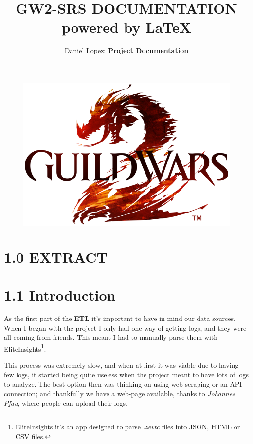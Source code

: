 \documentclass[12pt,a4paper]{article}
\title{%
    \vspace*{-5mm}\Huge GW2-SRS DOCUMENTATION \\
    \vspace*{2mm}\Large powered by \LaTeX}
\author{\vspace*{-5mm}\large Daniel Lopez: \textbf{Project Documentation}}
\begin{document}
    \maketitle

    \begin{figure}[H]
        \centering
        \includegraphics[width=1 \textwidth]{Images/Nuevo_logo_GW2.png}
    \end{figure}

    \newpage

    \section*{1.0 EXTRACT}

    \section*{\large 1.1 Introduction}
    As the first part of the \textbf{ETL} it's important to have in mind our data sources. When
    I began with the project I only had one way of getting logs, and they were all coming
    from friends. This meant I had to manually parse them with EliteInsights\footnote{EliteInsights it's an app designed to parse \textit{.zevtc} files into JSON, HTML or CSV files.}. 

    This process was extremely slow, and when at first it was viable due to having few logs,
    it started being quite useless when the project meant to have lots of logs to analyze.
    The best option then was thinking on using web-scraping or an API connection; and thankfully
    we have a web-page available, thanks to \textit{Johannes Pfau}, where people can upload their logs.\\
\end{document}
